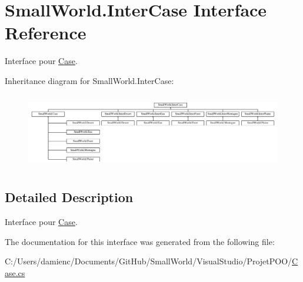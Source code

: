 \hypertarget{interface_small_world_1_1_inter_case}{\section{Small\-World.\-Inter\-Case Interface Reference}
\label{interface_small_world_1_1_inter_case}
}


Interface pour \hyperlink{class_small_world_1_1_case}{Case}.  


Inheritance diagram for Small\-World.\-Inter\-Case\-:\begin{figure}[H]
\begin{center}
\leavevmode
\includegraphics[height=3.333333cm]{interface_small_world_1_1_inter_case}
\end{center}
\end{figure}


\subsection{Detailed Description}
Interface pour \hyperlink{class_small_world_1_1_case}{Case}. 

The documentation for this interface was generated from the following file\-:\begin{DoxyCompactItemize}
\item 
C\-:/\-Users/damienc/\-Documents/\-Git\-Hub/\-Small\-World/\-Visual\-Studio/\-Projet\-P\-O\-O/\hyperlink{_case_8cs}{Case.\-cs}\end{DoxyCompactItemize}
